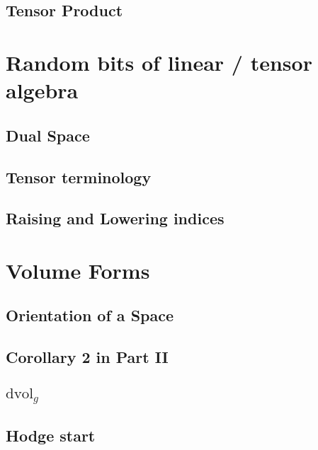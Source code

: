 \documentclass[12pt]{amsart}
\begin{document}
\subsection{Tensor Product}%
\label{sub:tensor_product}

\section{Random bits of linear / tensor algebra}%
\label{sec:random_bits_of_linear_tensor_algebra}

\subsection{Dual Space}%
\label{sub:dual_space}

\subsection{Tensor terminology}%
\label{sub:tensor_terminology}

\subsection{Raising and Lowering indices}%
\label{sub:raising_and_lowering_indices}

\section{Volume Forms}%
\label{sec:volume_forms}

\subsection{Orientation of a Space}%
\label{sub:orientation_of_a_space}

\subsection{Corollary 2 in Part II}%
\label{sub:corollary_2_in_part_ii}

\subsection{$\text{dvol}_g$}%
\label{sub:_dvol_g_}

\subsection{Hodge start}%
\label{sub:hodge_start}
\end{document}
